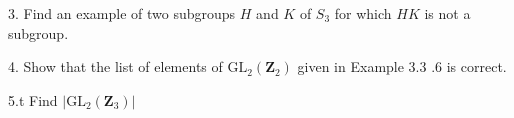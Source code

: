 \newpage
\begin{mdframed}[style=darkQuesion]
  3.  Find an example of two subgroups $H$ and $K$ of $S_{3}$ for which $H K$ is not a subgroup.

\end{mdframed}
\begin{mdframed}[style=darkAnswer,frametitle={Joe Starr}]
  
\end{mdframed}
\newpage
\begin{mdframed}[style=darkQuesion]
  4. Show that the list of elements of $\mathrm{GL}_{2}\left(\mathbf{Z}_{2}\right)$ given in Example 3.3 .6 is correct.
\end{mdframed}
\begin{mdframed}[style=darkAnswer,frametitle={Joe Starr}]
  
\end{mdframed}
\newpage
\begin{mdframed}[style=darkQuesion]
  5.t Find $\left|\mathrm{GL}_{2}\left(\mathbf{Z}_{3}\right)\right|$
\end{mdframed}
\begin{mdframed}[style=darkAnswer,frametitle={Joe Starr}]
  
\end{mdframed}
\newpage
